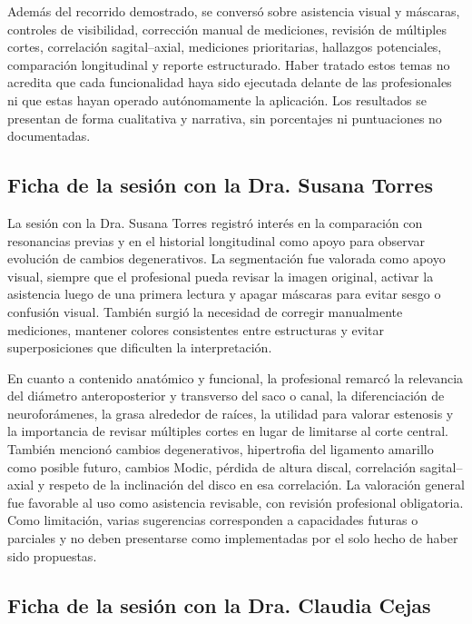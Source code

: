 Además del recorrido demostrado, se conversó sobre asistencia visual y máscaras, controles de visibilidad, corrección manual de mediciones, revisión de múltiples cortes, correlación sagital--axial, mediciones prioritarias, hallazgos potenciales, comparación longitudinal y reporte estructurado. Haber tratado estos temas no acredita que cada funcionalidad haya sido ejecutada delante de las profesionales ni que estas hayan operado autónomamente la aplicación. Los resultados se presentan de forma cualitativa y narrativa, sin porcentajes ni puntuaciones no documentadas.

\subsection{Ficha de la sesión con la Dra. Susana Torres}

La sesión con la Dra. Susana Torres registró interés en la comparación con resonancias previas y en el historial longitudinal como apoyo para observar evolución de cambios degenerativos. La segmentación fue valorada como apoyo visual, siempre que el profesional pueda revisar la imagen original, activar la asistencia luego de una primera lectura y apagar máscaras para evitar sesgo o confusión visual. También surgió la necesidad de corregir manualmente mediciones, mantener colores consistentes entre estructuras y evitar superposiciones que dificulten la interpretación.

En cuanto a contenido anatómico y funcional, la profesional remarcó la relevancia del diámetro anteroposterior y transverso del saco o canal, la diferenciación de neuroforámenes, la grasa alrededor de raíces, la utilidad para valorar estenosis y la importancia de revisar múltiples cortes en lugar de limitarse al corte central. También mencionó cambios degenerativos, hipertrofia del ligamento amarillo como posible futuro, cambios Modic, pérdida de altura discal, correlación sagital--axial y respeto de la inclinación del disco en esa correlación. La valoración general fue favorable al uso como asistencia revisable, con revisión profesional obligatoria. Como limitación, varias sugerencias corresponden a capacidades futuras o parciales y no deben presentarse como implementadas por el solo hecho de haber sido propuestas.

\subsection{Ficha de la sesión con la Dra. Claudia Cejas}

